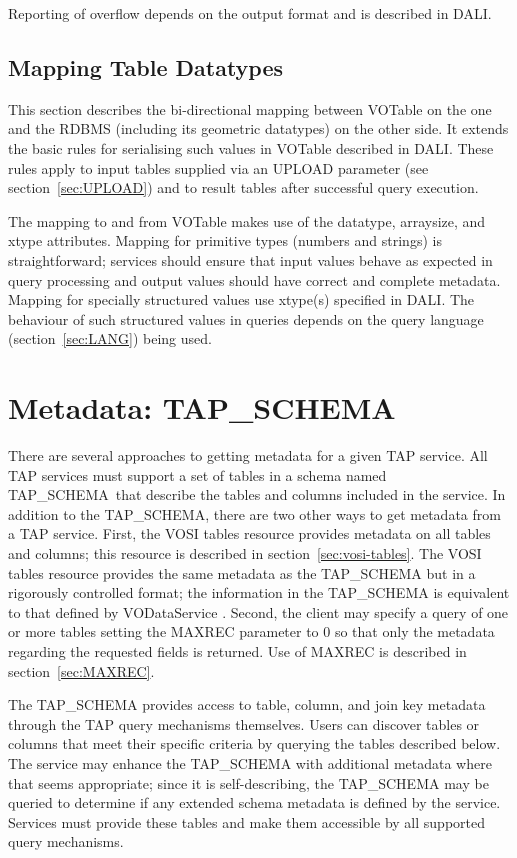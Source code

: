 \documentclass[11pt,letter]{ivoa}
\newcommand{\tapschema}{TAP\_SCHE\-MA}
\newcommand{\tapschema}{\mbox{%
  \relsize{-0.5}TAP\discretionary{-}{}{\kern-2pt\_}SCHEMA}}
\begin{document}
Reporting of overflow depends on the output format and is described in DALI.

\subsection{Mapping Table Datatypes}
\label{sec:vot-rdbms}

This section describes the bi-directional mapping between VOTable on the
one and the RDBMS (including its 
geometric datatypes) on the other side.  It extends the basic rules for serialising such values in 
VOTable described in DALI. These rules apply to input tables 
supplied via an UPLOAD parameter (see section~\ref{sec:UPLOAD}) and to result tables after successful 
query execution.

The mapping to and from VOTable makes use of the datatype, arraysize, and xtype 
attributes. Mapping for primitive types (numbers and strings) is 
straightforward; services should ensure that input values behave as 
expected in query processing and output values should have correct and complete 
metadata. Mapping for specially structured values use xtype(s) specified
in DALI. The behaviour of such structured values in queries depends 
on the query language (section~\ref{sec:LANG}) being used. 

\section{Metadata: TAP\kern-3pt\_SCHEMA}
\label{sec:tap-schema}

There are several approaches to getting metadata for a given TAP service. All 
TAP services must support a set of tables in a schema named 
\tapschema\ that describe the tables and columns included in the 
service. In addition to the \tapschema, there are two other ways 
to get metadata from a TAP service. First, the VOSI tables resource provides 
metadata on all tables and columns; this resource is described in 
section~\ref{sec:vosi-tables}. The 
VOSI tables resource provides the same metadata as the \tapschema{}
but in a rigorously controlled format; the information in the 
\tapschema{} is equivalent to that defined by VODataService 
\citep{2010ivoa.spec.1202P}. Second, the client may specify a query of one or more 
tables setting the 
MAXREC parameter to 0 so that only the metadata regarding the requested fields 
is returned. Use of MAXREC is described in section~\ref{sec:MAXREC}.

The \tapschema{} provides access to table, column, and join key 
metadata through the TAP query mechanisms themselves. Users can discover tables 
or columns that meet their specific criteria by querying the tables described 
below.  The service may enhance the \tapschema{} with additional 
metadata where that seems appropriate; since it is self-describing, the 
\tapschema{} may be queried to determine if any extended schema 
metadata is defined by the service. Services must provide these tables and make 
them accessible by all supported query mechanisms.
\end{document}
